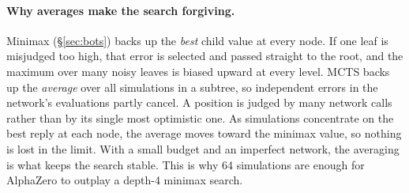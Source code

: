 \documentclass[11pt]{article}
\begin{document}
\paragraph{Why averages make the search forgiving.} Minimax (\S\ref{sec:bots})
backs up the \emph{best} child value at every node. If one leaf is misjudged
too high, that error is selected and passed straight to the root, and the
maximum over many noisy leaves is biased upward at every level. MCTS backs up
the \emph{average} over all simulations in a subtree, so independent errors in
the network's evaluations partly cancel. A position is judged by many network
calls rather than by its single most optimistic one. As simulations concentrate
on the best reply at each node, the average moves toward the minimax value, so
nothing is lost in the limit. With a small budget and an imperfect network, the
averaging is what keeps the search stable. This is why 64 simulations are enough
for AlphaZero to outplay a depth-4 minimax search.
\end{document}
